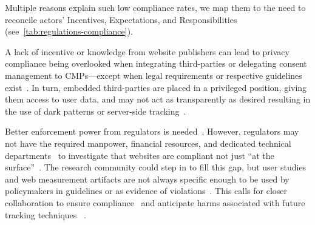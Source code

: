 Multiple reasons explain such low compliance rates, we map them to the need to reconcile actors' \colorbox{cellpink}{Incentives}, \colorbox{cellblue}{Expectations}, and \colorbox{cellgreen}{Responsibilities} (see~\autoref{tab:regulations-compliance}).



 A lack of incentive or knowledge from website publishers can lead to privacy compliance being overlooked when integrating third-parties or delegating consent management to CMPs---except when legal requirements or respective guidelines exist~\cite{utzPrivacyRarelyConsidered2023,Stov-etal-23-PETs}. In turn, embedded third-parties are placed in a privileged position, giving them access to user data, and may not act as transparently as desired resulting in the use of dark patterns or server-side tracking~\cite{tothDarkPatternsManipulation2022,grayDarkPatternsLegal2021,mehrnezhadHowCanWould2022}.

 Better enforcement power from regulators is needed~\cite{bollingerAutomatingCookieConsent2022,vannortwickSettingBarLow2022,mehrnezhadHowCanWould2022,motiTargetedTroublesomeTracking2024}. However, regulators may not have the required manpower, financial resources, and dedicated technical departments~\cite{edpbContributionEDPBReport2023} to investigate that websites are compliant not just ``at the surface''~\cite{kyiInvestigatingDeceptiveDesign2023}. The research community could step in to fill this gap, but user studies and web measurement artifacts are not always specific enough to be used by policymakers in guidelines or as evidence of violations~\cite{bielovaEffectDesignPatterns2024,Bielova2024-zr,bouhoulaAutomatedLargeScaleAnalysis2024}. 
This calls for closer collaboration to ensure compliance~\cite{saemannInvestigatingGDPRFines2022} and anticipate harms associated with future tracking techniques ~\cite{fouadDevilDetailsDetection2024,cuiUnderstandingPrivacyNorms2025,tothDarkPatternsManipulation2022,hoganMakingSensePrivate2026}.

